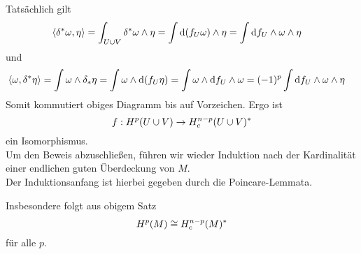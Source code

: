 \begin{Beweis}{}
\[\]
Tatsächlich gilt
\begin{align*}
\left<\delta^* \omega, \eta\right> = \int_{U\cup V} \delta^*\omega \wedge \eta 
&= \int \text{d}(f_U\omega) \wedge \eta
= \int \text{d} f_U \wedge \omega \wedge \eta
\end{align*}
und
\begin{align*}
\left<\omega, \delta^* \eta\right>=\int \omega \wedge \delta_* \eta 
&= \int \omega \wedge \text{d}  (f_U \eta)
 = \int \omega \wedge \text{d} f_U \wedge \omega
 =(-1)^p \int \text{d} f_U \wedge \omega \wedge \eta
\end{align*}
Somit kommutiert obiges Diagramm bis auf Vorzeichen. Ergo ist 
\[f : H^p{(U\cup V)} \overset{}{\rightarrow} H^{n-p}_c(U\cup V)^*\]
ein Isomorphismus.\\
Um den Beweis abzuschließen, führen wir wieder Induktion nach der Kardinalität einer endlichen guten Überdeckung von $M$.\\
Der Induktionsanfang ist hierbei gegeben durch die Poincare-Lemmata.
\end{Beweis}

\Kor{}
Insbesondere folgt aus obigem Satz
\[ H^p(M) \overset{}{\cong} H^{n-p}_c(M)^* \]
für alle $p$.